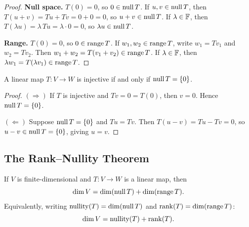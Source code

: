 \documentclass[11pt,a4paper]{article}
\begin{document}
\begin{proof}
\textbf{Null space.}\;
$T(0) = 0$, so $0 \in \operatorname{null} T$.  If $u, v \in \operatorname{null} T$, then
$T(u+v) = Tu + Tv = 0 + 0 = 0$, so $u + v \in \operatorname{null} T$.  If
$\lambda \in \mathbb{F}$, then $T(\lambda u) = \lambda\, Tu = \lambda \cdot 0 = 0$,
so $\lambda u \in \operatorname{null} T$.

\textbf{Range.}\;
$T(0) = 0$, so $0 \in \operatorname{range} T$.  If $w_1, w_2 \in \operatorname{range} T$, write
$w_1 = Tv_1$ and $w_2 = Tv_2$.  Then $w_1 + w_2 = T(v_1 + v_2) \in \operatorname{range} T$.
If $\lambda \in \mathbb{F}$, then $\lambda w_1 = T(\lambda v_1) \in \operatorname{range} T$.
\end{proof}

\begin{proposition}
\label{prop:injectivity}
A linear map $T\colon V \to W$ is injective if and only if
$\operatorname{null} T = \{0\}$.
\end{proposition}

\begin{proof}
$(\Rightarrow)$\; If $T$ is injective and $Tv = 0 = T(0)$, then $v = 0$.
Hence $\operatorname{null} T = \{0\}$.

$(\Leftarrow)$\; Suppose $\operatorname{null} T = \{0\}$ and $Tu = Tv$.  Then
$T(u - v) = Tu - Tv = 0$, so $u - v \in \operatorname{null} T = \{0\}$, giving
$u = v$.
\end{proof}

\subsection{The Rank--Nullity Theorem}

\begin{keyresult}[title={The Rank--Nullity Theorem}]
\begin{theorem}
\label{thm:rank_nullity}
If $V$ is finite-dimensional and $T\colon V \to W$ is a linear map, then
\[
  \dim V = \dim(\operatorname{null} T) + \dim(\operatorname{range} T).
\]
Equivalently, writing $\operatorname{nullity}(T) = \dim(\operatorname{null} T)$ and
$\operatorname{rank}(T) = \dim(\operatorname{range} T)$:
\[
  \dim V = \operatorname{nullity}(T) + \operatorname{rank}(T).
\]
\end{theorem}
\end{keyresult}
\end{document}
